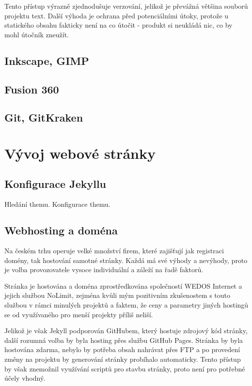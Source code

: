 \documentclass[a4paper, 12pt]{article}
\begin{document}
  Tento přístup výrazně zjednodušuje verzování, jelikož je převážná většina souborů projektu text. Další výhoda je ochrana před potenciálními útoky, protože u statického obsahu fakticky není na co útočit - produkt si neukládá nic, co by mohl útočník zneužít.

  \subsection{Inkscape, GIMP}

  \subsection{Fusion 360}

  \subsection{Git, GitKraken}

  \section{Vývoj webové stránky}

  \subsection{Konfigurace Jekyllu}
  Hledání themu.
  Konfigurace themu.

  \subsection{Webhosting a doména}
  Na českém trhu operuje velké množství firem, které zajišťují jak registraci domény, tak hostování samotné stránky. Každá má své výhody a nevýhody, proto je volba provozovatele vysoce individuální a záleží na řadě faktorů.

  Stránka je hostována a doména zprostředkována společností WEDOS Internet a jejich službou NoLimit, zejména kvůli mým pozitivním zkušenostem s touto službou v rámci minulých projektů a faktem, že ceny a parametry jiných hostingů se od využívaného pro menší projekty příliš neliší.

  Jelikož je však Jekyll podporován GitHubem, který hostuje zdrojový kód stránky, další rozumná volba by byla hosting přes službu GitHub Pages\cite{github-pages}. Stránka by byla hostována zdarma, nebylo by potřeba obsah nahrávat přes FTP a po provedení změny na projektu by generování stránky probíhalo automaticky. Tento přístup by však znemožnil využívání scriptů pro stavbu stránky, proto není pro potřebné účely vhodný.
\end{document}
